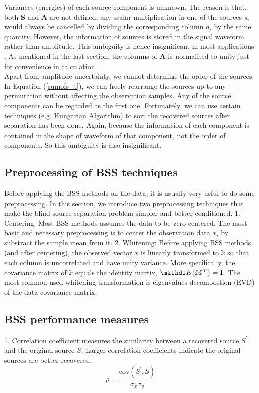 Variances (energies) of each source component is unknown. The reason is that, both $\mathbf{S}$ and $\mathbf{A}$ are not defined, any scalar multiplication in one of the sources $s_i$ would always be cancelled by dividing the corresponding column $a_i$ by the same quantity. However, the information of sources is stored in the signal waveform rather than amplitude. This ambiguity is hence insignificant in most applications \cite{HYVARINEN2000411}. As mentioned in the last section, the columns of $\mathbf{A}$ is normalised to unity just for convenience in calculation.\\

Apart from amplitude uncertainty, we cannot determine the order of the sources. In Equation (\ref{sumofs_t}), we can freely rearrange the sources up to any permutation without affecting the observation samples. Any of the source components can be regarded as the first one. Fortunately, we can use certain techniques (e.g. Hungarian Algorithm) to sort the recovered sources after separation has been done. Again, because the information of each component is contained in the shape of waveform of that component, not the order of components. So this ambiguity is also insignificant.

\subsection{Preprocessing of BSS techniques}
Before applying the BSS methods on the data, it is usually very usful to do some preprocessing. In this section, we introduce two preprocessing techniques that make the blind source separation problem simpler and better conditioned.
1. Centering:
Most BSS methods assumes the data to be zero centered. The most basic and necessary preprocessing is to center the observation data $x_i$ by substract the sample mean from it. 
2. Whitening:
Before applying BSS methods (and after centering), the observed vector $x$ is linearly transformed to $\tilde{x}$ so that each column is uncorrelated and have unity variance. More specifically, the covariance matrix of $\tilde{x}$ equals the identity martix, $\E\{\tilde{x}\tilde{x}^T\} = \mathbf{I}$. The most common used whitening transformation is eigenvalues decompostion (EVD) of the data covariance matrix.

\subsection{BSS performance measures}
\label{perform_metric}
1. Correlation coefficient measures the similarity between a recovered source $S^{'}$ and the original source $S$. Larger correlation coefficients indicate the original sources are better recovered.
\begin{equation}
    \rho = \frac{\text{cov}(S^{'},S)}{\sigma_x \sigma_y}
\end{equation}

